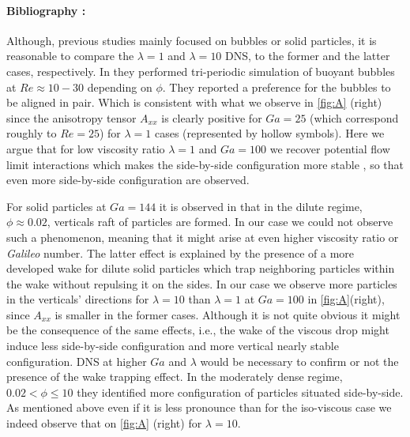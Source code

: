 \paragraph*{Bibliography : } 
Although, previous studies mainly focused on bubbles or solid particles, it is reasonable to compare the $\lambda = 1$ and $\lambda = 10$ DNS, to the former and the latter cases, respectively. 
In \citet{bunner2002dynamics} they performed tri-periodic simulation of buoyant bubbles at $Re \approx 10-30$ depending on $\phi$.
They reported a preference for the bubbles to be aligned in pair. 
Which is consistent with what we observe in \ref{fig:A} (right) since the anisotropy tensor $A_{xx}$ is clearly positive for $Ga = 25$ (which correspond roughly to $Re = 25$) for $\lambda = 1$ cases (represented by hollow symbols). 
Here we argue that for low viscosity ratio $\lambda = 1$ and $Ga = 100$ we recover potential flow limit interactions which makes the side-by-side configuration more stable \citep{legendre2003hydrodynamic}, so that even more side-by-side configuration are observed. 

For solid particles at $Ga = 144$ it is observed in \citet{shajahan2023inertial} that in the dilute regime, $\phi \approx 0.02$, verticals raft of particles are formed. 
In our case we could not observe such a phenomenon, meaning that it might arise at even higher viscosity ratio or \textit{Galileo} number. 
The latter effect is explained by the presence of a more developed wake for dilute solid particles which trap neighboring particles within the wake without repulsing it on the sides. 
In our case we observe more particles in the verticals' directions for $\lambda = 10$ than $\lambda =1$ at $Ga =100$ in \ref{fig:A}(right), since $A_{xx}$ is smaller in the former cases.
Although it is not quite obvious it might be the consequence of the same effects, i.e., the wake of the viscous drop might induce less side-by-side configuration and more vertical nearly stable configuration. 
DNS at higher $Ga$ and $\lambda$ would be necessary to confirm or not the presence of the wake trapping effect.  
In the moderately dense regime,  $0.02 < \phi \le 10$ they identified more configuration of particles situated side-by-side. 
As mentioned above even if it is less pronounce than for the iso-viscous case we indeed observe that on \ref{fig:A} (right) for $\lambda = 10$. 


